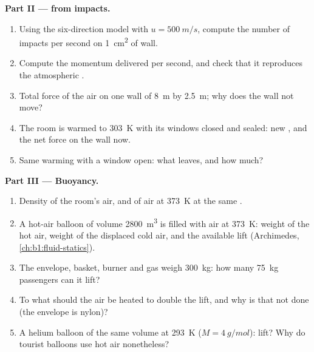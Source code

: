 \begin{problem}
\medskip
\noindent\textbf{Part II ---  from impacts.}
\begin{enumerate}[resume]
  \item Using the six-direction model with $u = \qty{500}{m/s}$, compute
        the number of impacts per second on \qty{1}{cm^2} of wall.
  \item Compute the momentum delivered per second, and check that it
        reproduces the atmospheric .
  \item Total force of the air on one wall of \qty{8}{m} by \qty{2.5}{m};
        why does the wall not move?
  \item The room is warmed to \qty{303}{K} with its windows closed and
        sealed: new , and the net force on the wall now.
  \item Same warming with a window open: what leaves, and how much?
\end{enumerate}

\medskip
\noindent\textbf{Part III --- Buoyancy.}
\begin{enumerate}[resume]
  \item Density of the room's air, and of air at \qty{373}{K} at the same
        .
  \item A hot-air balloon of volume \qty{2800}{m^3} is filled with air at
        \qty{373}{K}: weight of the hot air, weight of the displaced cold
        air, and the available lift (Archimedes,
        \cref{ch:b1:fluid-statics}).
  \item The envelope, basket, burner and gas weigh \qty{300}{kg}: how many
        \qty{75}{kg} passengers can it lift?
  \item To what  should the air be heated to double the lift,
        and why is that not done (the envelope is nylon)?
  \item A helium balloon of the same volume at \qty{293}{K}
        ($M = \qty{4}{g/mol}$): lift? Why do tourist balloons use hot air
        nonetheless?
\end{enumerate}


\end{problem}
